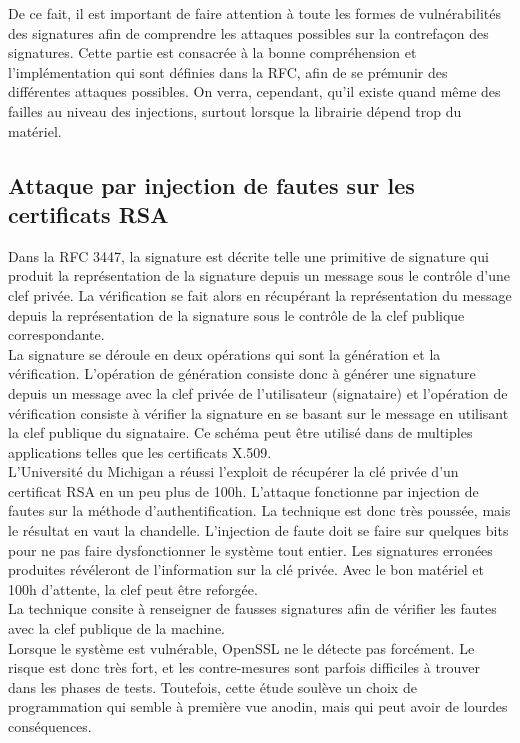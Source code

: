 De ce fait, il est important de faire attention à toute les formes de vulnérabilités des signatures afin de comprendre les attaques possibles sur la contrefaçon des signatures. Cette partie est consacrée à la bonne compréhension et l'implémentation qui sont définies dans la RFC, afin de se prémunir des différentes attaques possibles. On verra, cependant, qu'il existe quand même des failles au niveau des injections, surtout lorsque la librairie dépend trop du matériel. 

\subsection{Attaque par injection de fautes sur les certificats RSA}
Dans la RFC 3447, la signature est décrite telle une primitive de signature qui produit la représentation de la signature depuis un message sous le contrôle d'une clef privée. La vérification se fait alors en récupérant la représentation du message depuis la représentation de la signature sous le contrôle de la clef publique correspondante.\\

La signature se déroule en  deux opérations qui sont la génération et la vérification. L'opération de génération consiste donc à générer une signature depuis un message avec la clef privée de l'utilisateur (signataire) et l'opération de vérification consiste à vérifier la signature en se basant sur le message en utilisant la clef publique du signataire. 
Ce schéma peut être utilisé dans de multiples applications telles que les certificats X.509.\\

L'Université du Michigan a réussi l'exploit de récupérer la clé privée d'un certificat RSA en un peu plus de 100h. L'attaque fonctionne par injection de fautes sur la méthode d'authentification. La technique est donc très poussée, mais le résultat en vaut la chandelle. L'injection de faute doit se faire sur quelques bits pour ne pas faire dysfonctionner le système tout entier. Les signatures erronées produites révéleront de l'information sur la clé privée. Avec le bon matériel et 100h d'attente, la clef peut être reforgée.\\

			La technique consite à renseigner de fausses signatures afin de vérifier les fautes avec la clef publique de la machine.\\
			
			Lorsque le système est vulnérable, OpenSSL ne le détecte pas forcément. Le risque est donc très fort, et les contre-mesures sont parfois difficiles à trouver dans les phases de tests. Toutefois, cette étude soulève un choix de programmation qui semble à première vue anodin, mais qui peut avoir de lourdes conséquences.\\


